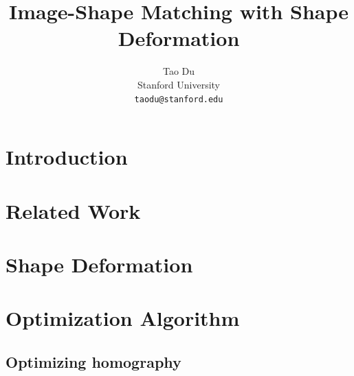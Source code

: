 \documentclass[10pt,twocolumn,letterpaper]{article}
\begin{document}
\title{Image-Shape Matching with Shape Deformation}

\author{Tao Du\\
Stanford University\\
{\tt\small taodu@stanford.edu}
}

\maketitle

\begin{abstract}
\end{abstract}

\section{Introduction}

\section{Related Work}

\section{Shape Deformation}

\section{Optimization Algorithm}

\subsection{Optimizing homography}
\end{document}
